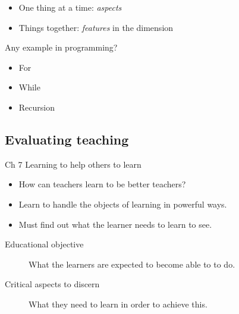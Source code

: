\begin{frame}
  \begin{remark}
    \begin{itemize}
      \item One thing at a time: \emph{aspects}
      \item Things together: \emph{features} in the dimension
    \end{itemize}
  \end{remark}

  \begin{question}
    Any example in programming?
  \end{question}
\end{frame}

\begin{frame}
  \begin{solution}[Repetitions]
    \begin{itemize}
      \item For
      \item While
      \item Recursion
    \end{itemize}
  \end{solution}
\end{frame}


\subsection{Evaluating teaching}

\begin{frame}
  \begin{block}{Ch 7 Learning to help others to learn}
    \begin{itemize}
      \item How can teachers learn to be better teachers?
      \item Learn to handle the objects of learning in powerful ways.
      \item Must find out what the learner needs to learn to see.
    \end{itemize}
  \end{block}

  \pause

  \begin{remark}
    \begin{description}
      \item[Educational objective]
        What the learners are expected to become able to to do.

      \item[Critical aspects to discern]
        What they need to learn in order to achieve this.
    \end{description}
  \end{remark}
\end{frame}

